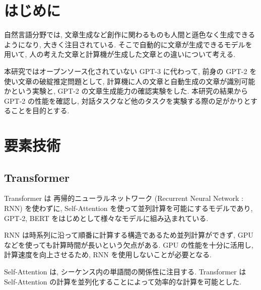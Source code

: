 \documentclass[twocolumn]{jarticle}     %
\begin{document}


\section{はじめに}


自然言語分野では, 文章生成など創作に関わるものも人間と遜色なく生成できるようになり,
大きく注目されている.
そこで自動的に文章が生成できるモデルを用いて,
人の考えた文章と計算機が生成した文章との違いについて考える.


本研究ではオープンソース化されていない GPT-3 に代わって,
前身の GPT-2 を使い文章の破綻推定問題として,
計算機に人の文章と自動生成の文章が識別可能かという実験と,
GPT-2 の文章生成能力の確認実験をした.
本研究の結果から GPT-2 の性能を確認し,
対話タスクなど他のタスクを実験する際の足がかりとすることを目的とする.

\section{要素技術}
\subsection{Transformer}
Transformer \cite{DBLP:journals/corr/VaswaniSPUJGKP17} は
再帰的ニューラルネットワーク (Recurrent Neural Network : RNN)
を使わずに, Self-Attention を使って並列計算を可能にするモデルであり, GPT-2, BERT をはじめとして様々なモデルに組み込まれている.

RNN は時系列に沿って順番に計算する構造であるため並列計算ができず,
GPU などを使っても計算時間が長いという欠点がある.
GPU の性能を十分に活用し, 計算速度を向上させるため, RNN を使用しないことが必要となる.

Self-Attention は, シーケンス内の単語間の関係性に注目する.
Transformer は Self-Attention の計算を並列化することによって効率的な計算を可能とした.
\end{document}
